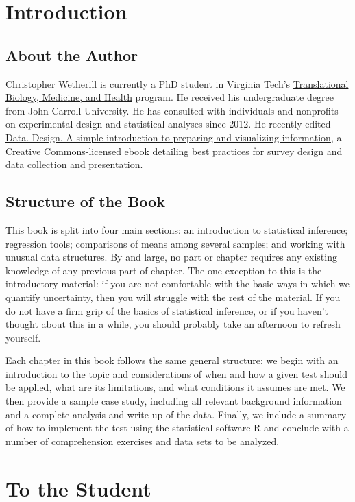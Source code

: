\begin{preface}
\section{Introduction}
\subsection{About the Author}
Christopher Wetherill is currently a PhD student in Virginia Tech's \href{http://www.tbmh.vt.edu/}{Translational Biology, Medicine, and Health} program. He received his undergraduate degree from John Carroll University. He has consulted with individuals and nonprofits on experimental design and statistical analyses since 2012. He recently edited \href{https://infoactive.co/ebook}{Data. Design. A simple introduction to preparing and visualizing information}, a Creative Commons-licensed ebook detailing best practices for survey design and data collection and presentation.

\subsection{Structure of the Book}
This book is split into four main sections: an introduction to statistical inference; regression tools; comparisons of means among several samples; and working with unusual data structures. By and large, no part or chapter requires any existing knowledge of any previous part of chapter. The one exception to this is the introductory material: if you are not comfortable with the basic ways in which we quantify uncertainty, then you will struggle with the rest of the material. If you do not have a firm grip of the basics of statistical inference, or if you haven't thought about this in a while, you should probably take an afternoon to refresh yourself.

Each chapter in this book follows the same general structure: we begin with an introduction to the topic and considerations of when and how a given test should be applied, what are its limitations, and what conditions it assumes are met. We then provide a sample case study, including all relevant background information and a complete analysis and write-up of the data. Finally, we include a summary of how to implement the test using the statistical software R and conclude with a number of comprehension exercises and data sets to be analyzed.

\section{To the Student}

\end{preface}
